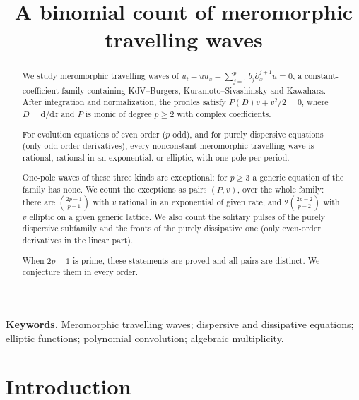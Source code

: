 \documentclass[11pt]{article}
\title{A binomial count of meromorphic travelling waves}
\date{}
\theoremstyle{definition}
\theoremstyle{remark}
\numberwithin{equation}{section}
\begin{document}
\maketitle

\begin{abstract}
We study meromorphic travelling waves of
\(u_t+uu_x+\sum_{j=1}^{p}b_j\partial_x^{j+1}u=0\), a
constant-coefficient family containing KdV--Burgers,
Kuramoto--Sivashinsky and Kawahara. After integration and
normalization, the profiles satisfy \(P(D)v+v^2/2=0\), where
\(D=\mathrm d/\mathrm dz\) and \(P\) is monic of degree \(p\ge2\) with
complex coefficients.

For evolution equations of even order (\(p\) odd), and for purely
dispersive equations (only odd-order derivatives), every nonconstant
meromorphic travelling wave is rational, rational in an exponential, or
elliptic, with one pole per period.

One-pole waves of these three kinds are exceptional: for \(p\ge3\) a
generic equation of the family has none. We count the exceptions as
pairs \((P,v)\), over the whole family: there are
\(\binom{2p-1}{p-1}\) with \(v\) rational in an exponential of given
rate, and \(2\binom{2p-2}{p-2}\) with \(v\) elliptic on a given generic
lattice. We also count the solitary pulses of the purely dispersive
subfamily and the fronts of the purely dissipative one (only even-order
derivatives in the linear part).

When \(2p-1\) is prime, these statements are proved and all pairs are
distinct. We conjecture them in every order.
\end{abstract}

\noindent\textbf{Keywords.}
Meromorphic travelling waves; dispersive and dissipative equations;
elliptic functions; polynomial convolution; algebraic multiplicity.

\section{Introduction}\label{sec:intro}
\end{document}
